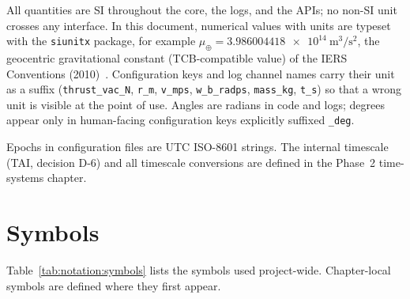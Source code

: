 All quantities are SI throughout the core, the logs, and the APIs; no
non-SI unit crosses any interface. In this document, numerical values with
units are typeset with the \texttt{siunitx} package, for example
$\mu_\oplus = \qty{3.986004418e14}{\metre\cubed\per\second\squared}$, the
geocentric gravitational constant (TCB-compatible value) of the IERS
Conventions (2010)~\cite{iers2010}. Configuration keys and log channel names
carry their unit as a suffix (\texttt{thrust\_vac\_N}, \texttt{r\_m},
\texttt{v\_mps}, \texttt{w\_b\_radps}, \texttt{mass\_kg}, \texttt{t\_s}) so
that a wrong unit is visible at the point of use. Angles are radians in code
and logs; degrees appear only in human-facing configuration keys explicitly
suffixed \texttt{\_deg}.

Epochs in configuration files are UTC ISO-8601 strings. The internal
timescale (TAI, decision D-6) and all timescale conversions are defined in
the Phase~2 time-systems chapter.

\section{Symbols}
\label{sec:notation:symbols}

Table~\ref{tab:notation:symbols} lists the symbols used project-wide.
Chapter-local symbols are defined where they first appear.


